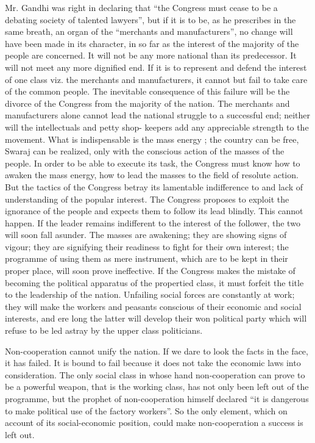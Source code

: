 Mr. Gandhi was right in declaring that “the Congress must cease to be a debating society of talented lawyers”, but if it is to be, as he prescribes in the same breath, an organ of the “merchants and manufacturers”, no change will have been made in its character, in so far as the interest of the majority of the people are concerned. It will not be any more national than its predecessor. It will not meet any more dignified end. If it is to represent and defend the interest of one class viz. the merchants and manufacturers, it cannot but fail to take care of the common people. The inevitable consequence of this failure will be the divorce of the Congress from the majority of the nation. The merchants and manufacturers alone cannot lead the national struggle to a successful end; neither will the intellectuals and petty shop- 
keepers add any appreciable strength to the movement. What is indispensable is the mass energy ; the country can be free, Swaraj can be realized, only with the conscious action of the masses of the people. In order to be able to execute its task, the Congress must know how to awaken the mass energy, how to lead the masses to the field of resolute action. But the tactics of the Congress betray its lamentable indifference to and lack of understanding of the popular interest. The Congress proposes to exploit the ignorance of the people and expects them to follow its lead blindly. This cannot happen. If the leader remains indifferent to the interest of the follower, the two will soon fall asunder. The masses are awakening; they are showing signs of vigour; they are signifying their readiness to fight for their own interest; the 
programme of using them as mere instrument, which are to be kept in their proper place, will soon prove ineffective. If the Congress makes the mistake of becoming the political apparatus of the propertied class, it must forfeit the title to the leadership of the nation. Unfailing social forces are constantly at work; they will make the workers and peasants conscious of their economic and social interests, and ere long 
the latter will develop their won political party which will refuse to be led astray by the upper class politicians. 

Non-cooperation cannot unify the nation. If we dare to look the facts in the face, it has failed. It is bound to fail because it does not take the economic laws into consideration. The only social class in whose hand non-cooperation can prove to be a powerful weapon, that is the working class, has not only been left out of the programme, but the prophet of non-cooperation himself declared “it is dangerous to make political use of the factory workers”. So the only element, which on account of its social-economic position, could make non-cooperation a success is left out. 

